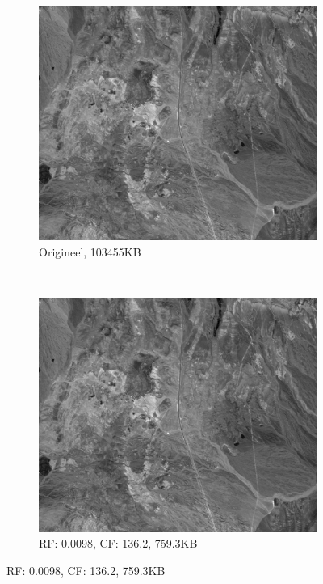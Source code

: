 \begin{figure}[]
\centering
\begin{subfigure}{\textwidth}
  \centering
  \includegraphics[scale=0.55]{images/cuprite_cropped_sum.png}
  \caption{Origineel, 103455KB}
\end{subfigure}
\\
\begin{subfigure}{\textwidth}
  \centering
  \includegraphics[scale=0.55]{images/example_compression_Cuprite_0_01.png}
  \caption{RF: 0.0098, CF: 136.2, 759.3KB}
\end{subfigure}
\end{figure}
